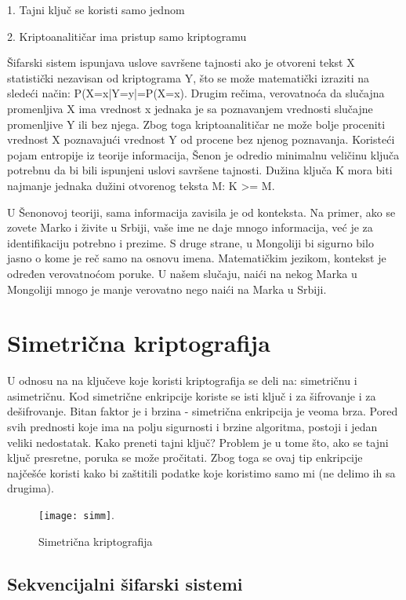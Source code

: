 \documentclass[a4paper]{article}
\begin{document}
1. Tajni ključ se koristi samo jednom

2. Kriptoanalitičar ima pristup samo kriptogramu

Šifarski sistem ispunjava uslove savršene tajnosti ako je otvoreni tekst X statistički nezavisan od kriptograma Y, što se može matematički izraziti na sledeći način: P(X=x|Y=y|=P(X=x). Drugim rečima, verovatnoća da slučajna promenljiva X ima vrednost x jednaka je sa poznavanjem vrednosti slučajne promenljive Y ili bez njega. Zbog toga kriptoanalitičar ne može bolje proceniti vrednost X poznavajući vrednost Y od procene bez njenog poznavanja. Koristeći pojam entropije iz teorije informacija, Šenon je odredio minimalnu veličinu ključa potrebnu da bi bili ispunjeni uslovi savršene tajnosti. Dužina ključa K mora biti najmanje jednaka dužini otvorenog teksta M: K >= M.

U Šenonovoj teoriji, sama informacija zavisila je od konteksta. Na primer, ako se zovete Marko i živite u Srbiji, vaše ime ne daje mnogo informacija, već je za identifikaciju potrebno i prezime. S druge strane, u Mongoliji bi sigurno bilo jasno o kome je reč samo na osnovu imena. Matematičkim jezikom, kontekst je određen verovatnoćom poruke. U našem slučaju, naići na nekog Marka u Mongoliji mnogo je manje verovatno nego naići na Marka u Srbiji. 

\section{Simetrična kriptografija}
\label{sec:simetricčna_kriptografija}
U odnosu na na ključeve koje koristi kriptografija se deli na: simetričnu i asimetričnu.
Kod simetrične enkripcije \cite{sim} koriste se isti ključ i za šifrovanje i za dešifrovanje. Bitan faktor je i brzina - simetrična enkripcija je veoma brza. Pored svih prednosti koje ima na polju sigurnosti i brzine algoritma, postoji i jedan veliki nedostatak. Kako preneti tajni ključ? Problem je u tome što, ako se tajni ključ presretne, poruka se može pročitati. Zbog toga se ovaj tip enkripcije najčešće koristi kako bi zaštitili podatke koje koristimo samo mi (ne delimo ih sa drugima).

\begin{figure}[h!]
    \centering
    \texttt{[image: simm]}.
    \caption{Simetrična kriptografija}
    \label{fig:simetična_kriptografija}
\end{figure}

\newpage
\subsection{Sekvencijalni šifarski sistemi}
\label{subsec:sekvencijalni_šifarski_sistemi}
\end{document}
